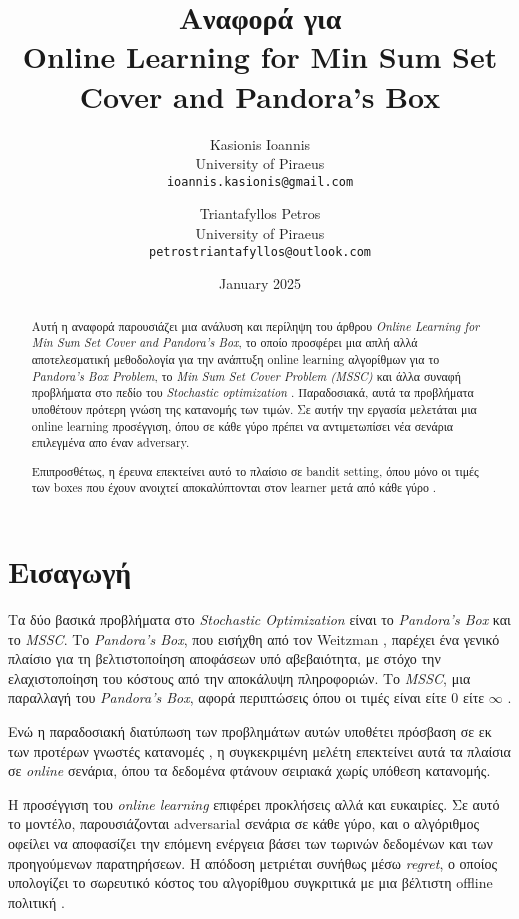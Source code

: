 \documentclass[11pt,a4paper]{article}
\title{Αναφορά για \\ \textbf{Online Learning for Min Sum Set Cover and Pandora's Box}}
\author{
    Kasionis Ioannis \\ University of Piraeus \\ \texttt{ioannis.kasionis@gmail.com}
    \and
    Triantafyllos Petros \\ University of Piraeus \\ \texttt{petrostriantafyllos@outlook.com}
}
\date{January 2025}
\begin{document}
\maketitle

\begin{abstract}
Αυτή η αναφορά παρουσιάζει μια ανάλυση και περίληψη του άρθρου \textit{Online Learning for Min Sum Set Cover and Pandora's Box}, το οποίο προσφέρει μια απλή αλλά αποτελεσματική μεθοδολογία για την ανάπτυξη online learning αλγορίθμων για το \textit{Pandora's Box Problem}, το \textit{Min Sum Set Cover Problem (MSSC)} και άλλα συναφή προβλήματα στο πεδίο του \textit{Stochastic optimization} \cite{gergatsouli2022online}. Παραδοσιακά, αυτά τα προβλήματα υποθέτουν πρότερη γνώση της κατανομής των τιμών. Σε αυτήν την εργασία μελετάται μια online learning προσέγγιση, όπου σε κάθε γύρο πρέπει να αντιμετωπίσει νέα σενάρια επιλεγμένα απο έναν adversary. \par

Επιπροσθέτως, η έρευνα επεκτείνει αυτό το πλαίσιο σε bandit setting, όπου μόνο οι τιμές των boxes που έχουν ανοιχτεί αποκαλύπτονται στον learner μετά από κάθε γύρο \cite{gergatsouli2022online}.
\end{abstract}

\section{Εισαγωγή}
Τα δύο βασικά προβλήματα στο \textit{Stochastic Optimization} είναι το \textit{Pandora's Box} και το \textit{MSSC}. 
Το \textit{Pandora's Box}, που εισήχθη από τον Weitzman \cite{weitzman1978optimal}, παρέχει ένα γενικό πλαίσιο για τη βελτιστοποίηση αποφάσεων υπό αβεβαιότητα, με στόχο την ελαχιστοποίηση του κόστους από την αποκάλυψη πληροφοριών. 
Το \textit{MSSC}, μια παραλλαγή του \textit{Pandora's Box}, αφορά περιπτώσεις όπου οι τιμές είναι είτε $0$ είτε $\infty$ \cite{feige2004approximating}. \par

Ενώ η παραδοσιακή διατύπωση των προβλημάτων αυτών υποθέτει πρόσβαση σε εκ των προτέρων γνωστές κατανομές \cite{gergatsouli2022online}, η συγκεκριμένη μελέτη επεκτείνει αυτά τα πλαίσια σε \textit{online} σενάρια, όπου τα δεδομένα φτάνουν σειριακά χωρίς υπόθεση κατανομής. \par

Η προσέγγιση του \textit{online learning} επιφέρει προκλήσεις αλλά και ευκαιρίες. Σε αυτό το μοντέλο, παρουσιάζονται adversarial σενάρια σε κάθε γύρο, και ο αλγόριθμος οφείλει να αποφασίζει την επόμενη ενέργεια βάσει των τωρινών δεδομένων και των προηγούμενων παρατηρήσεων. Η απόδοση μετριέται συνήθως μέσω \textit{regret}, ο οποίος υπολογίζει το σωρευτικό κόστος του αλγορίθμου συγκριτικά με μια βέλτιστη offline πολιτική \cite{shalev2012online}.
\newline
\end{document}
